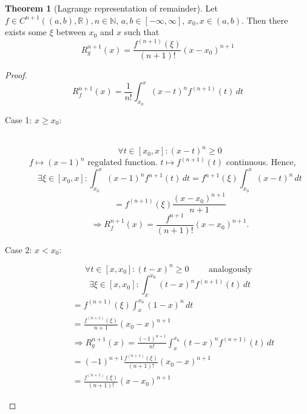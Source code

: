 \documentclass[a4paper,landscape,twocolumn]{article}
\theoremstyle{definition}
\newtheorem{theorem}{Theorem}
\begin{document}
\begin{theorem}[Lagrange representation of remainder]
  Let $f \in C^{n+1}((a,b), \mathbb R), n \in \mathbb N$,
  $a,b \in [-\infty, \infty]$, $x_0,x \in (a,b)$. Then there exists some $\xi$
  between $x_0$ and $x$ such that
  \[ R_g^{n+1}(x) = \frac{f^{(n+1)}(\xi)}{(n+1)!} (x - x_0)^{n+1} \]
\end{theorem}
\begin{proof}
  \[ R_f^{n+1}(x) = \frac{1}{n!} \int_{x_0}^x (x - t)^n f^{(n+1)}(t) \, dt \]
  \begin{description}
    \item[Case 1: $x \geq x_0$:] \hfill{} \\
      \[ \forall t \in [x_0, x]: (x - t)^n \geq 0 \]
      $f \mapsto (x - 1)^n$ regulated function.
      $t \mapsto f^{(n+1)}(t)$ continuous. Hence,
      \[
        \exists \xi \in [x_0, x]:
        \int_{x_0}^x (x - 1)^n f^{n+1} (t) \, dt
        = f^{n+1}(\xi) \int_{x_0}^x (x - t)^n \, dt
      \] \[
        = f^{(n+1)}(\xi) \frac{(x - x_0)^{n+1}}{n + 1}
      \] \[
        \Rightarrow R_f^{n+1}(x) = \frac{f^{n+1}}{(n+1)!} (x - x_0)^{n+1}.
      \]
    \item[Case 2: $x < x_0$:]
      \[
        \forall t \in [x, x_0]: (t - x)^n \geq 0 \qquad \text{ analogously }
      \] \[
        \exists \xi \in [x, x_0]: \int_{x}^{x_0} (t - x)^n f^{(n+1)} (t) \, dt
      \]
      \begin{align*}
        &= f^{(n+1)}(\xi) \int_x^{x_0} (1 - x)^n \, dt \\
        &= \frac{f^{(n+1)}(\xi)}{n+1} (x_0 - x)^{n+1} \\
        &\Rightarrow R_g^{n+1}(x) = \frac{(-1)^{n+1}}{n!} \int_{x}^{x_0} (t - x)^n f^{(n+1)}(t) \, dt \\
        &= (-1)^{n+1} \frac{f^{(n+1)}(\xi)}{(n+1)!} (x_0 - x)^{n+1} \\
        &= \frac{f^{(n+1)}(\xi)}{(n+1)!} (x - x_0)^{n+1}
      \end{align*}
  \end{description}
\end{proof}
\end{document}
